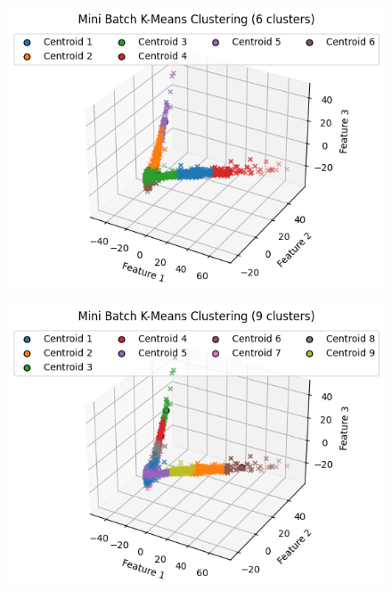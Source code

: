 \documentclass{template}
\begin{document}
\begin{figure}
\includegraphics[scale=0.7]{Clustering3.png.jpg.png}
\caption{}
\label{fig:logo}
\end{figure}
\begin{figure}
\includegraphics[scale=0.7]{Clustering4.png.jpg.png}
\caption{}
\label{fig:logo}
\end{figure}
\end{document}
